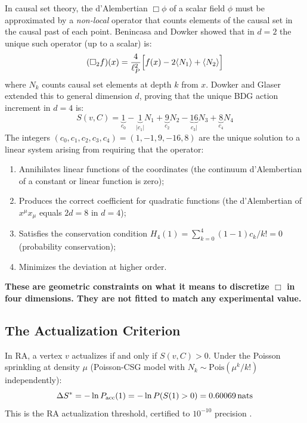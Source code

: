 \documentclass[12pt,a4paper]{article}
\begin{document}
In causal set theory, the d'Alembertian $\Box\phi$ of a scalar field $\phi$ must be approximated by a \emph{non-local} operator that counts elements of the causal set in the causal past of each point.  Benincasa and Dowker \cite{Benincasa2010} showed that in $d=2$ the unique such operator (up to a scalar) is:
\begin{equation}
  (\Box_2 f)(x) = \frac{4}{\ell_P^2}\Bigl[
    f(x) - 2\langle N_1\rangle + \langle N_2\rangle
  \Bigr]
\end{equation}
where $N_k$ counts causal set elements at depth $k$ from $x$.  Dowker and Glaser \cite{Dowker2013} extended this to general dimension $d$, proving that the unique BDG action increment in $d=4$ is:
\begin{equation}
  \boxed{S(v,C) = \underbrace{1}_{c_0} - \underbrace{1}_{|c_1|}N_1 + \underbrace{9}_{c_2}N_2 - \underbrace{16}_{c_3|}\!N_3 + \underbrace{8}_{c_4}N_4}
  \label{eq:BDG}
\end{equation}
The integers $(c_0,c_1,c_2,c_3,c_4) = (1,-1,9,-16,8)$ are the unique solution to a linear system arising from requiring that the operator:
\begin{enumerate}
  \item Annihilates linear functions of the coordinates (the continuum d'Alembertian of a constant or linear function is zero);
  \item Produces the correct coefficient for quadratic functions (the d'Alembertian of $x^\mu x_\mu$ equals $2d = 8$ in $d=4$);
  \item Satisfies the conservation condition $H_4(1) = \sum_{k=0}^{4}(1-1)c_k/k! = 0$ (probability conservation);
  \item Minimizes the deviation at higher order.
\end{enumerate}
\textbf{These are geometric constraints on what it means to discretize $\Box$ in four dimensions. They are not fitted to match any experimental value.}

\subsection{The Actualization Criterion}

In RA, a vertex $v$ actualizes if and only if $S(v,C) > 0$.  Under the Poisson sprinkling at density $\mu$ (Poisson-CSG model with $N_k \sim \mathrm{Pois}(\mu^k/k!)$ independently):
\begin{equation}
  \Delta S^* = -\ln P_{\mathrm{acc}}(1) = -\ln P(S(1)>0) = 0.60069\,\mathrm{nats}
  \label{eq:dSstar}
\end{equation}
This is the RA actualization threshold, certified to $10^{-10}$ precision \statusCV.
\end{document}
